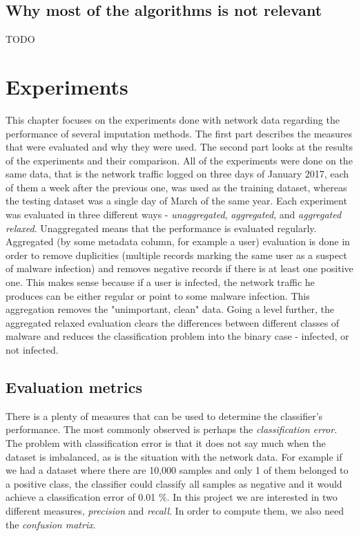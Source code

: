 \documentclass[11pt]{article}
\begin{document}
    \subsection{Why most of the algorithms is not relevant}
      {\color{red}TODO}
  \newpage
  \section{Experiments}
    This chapter focuses on the experiments done with network data regarding the performance of several imputation methods. The first part describes the measures that were evaluated and why they were used. The second part looks at the results of the experiments and their comparison. All of the experiments were done on the same data, that is the network traffic logged on three days of January 2017, each of them a week after the previous one, was used as the training dataset, whereas the testing dataset was a single day of March of the same year. Each experiment was evaluated in three different ways - {\it unaggregated}, {\it aggregated}, and {\it aggregated relaxed}. Unaggregated means that the performance is evaluated regularly. Aggregated (by some metadata column, for example a user) evaluation is done in order to remove duplicities (multiple records marking the same user as a suspect of malware infection) and removes negative records if there is at least one positive one. This makes sense because if a user is infected, the network traffic he produces can be either regular or point to some malware infection. This aggregation removes the "unimportant, clean" data. Going a level further, the aggregated relaxed evaluation clears the differences between different classes of malware and reduces the classification problem into the binary case - infected, or not infected.
    \subsection{Evaluation metrics}
      There is a plenty of measures that can be used to determine the classifier's performance. The most commonly observed is perhaps the {\it classification error}\cite{brabec}. The problem with classification error is that it does not say much when the dataset is imbalanced, as is the situation with the network data. For example if we had a dataset where there are 10,000 samples and only 1 of them belonged to a positive class, the classifier could classify all samples as negative and it would achieve a classification error of 0.01 \%. In this project we are interested in two different measures, {\it precision} and {\it recall}. In order to compute them, we also need the {\it confusion matrix}.
\end{document}

